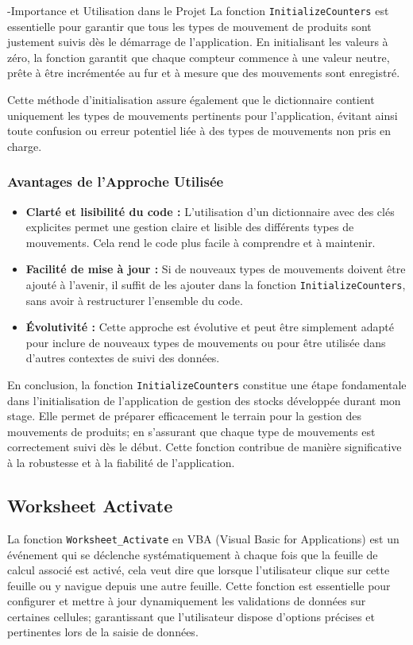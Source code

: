 \documentclass[a4paper, oneside, 12pt, final]{extreport}
\begin{document}
-Importance et Utilisation dans le Projet
La fonction \texttt{InitializeCounters} est essentielle pour garantir que tous les types de mouvement de produits sont justement suivis dès le démarrage de l'application. En initialisant les valeurs à zéro, la fonction garantit que chaque compteur commence à une valeur neutre, prête à être incrémentée au fur et à mesure que des mouvements sont enregistré.

Cette méthode d'initialisation assure également que le dictionnaire contient uniquement les types de mouvements pertinents pour l'application, évitant ainsi toute confusion ou erreur potentiel liée à des types de mouvements non pris en charge.

\subsubsection{Avantages de l'Approche Utilisée}
\begin{itemize}
    \item \textbf{Clarté et lisibilité du code :} L'utilisation d'un dictionnaire avec des clés explicites permet une gestion claire et lisible des différents types de mouvements. Cela rend le code plus facile à comprendre et à maintenir.
    \item \textbf{Facilité de mise à jour :} Si de nouveaux types de mouvements doivent être ajouté à l'avenir, il suffit de les ajouter dans la fonction \texttt{InitializeCounters}, sans avoir à restructurer l'ensemble du code.
    \item \textbf{Évolutivité :} Cette approche est évolutive et peut être simplement adapté pour inclure de nouveaux types de mouvements ou pour être utilisée dans d'autres contextes de suivi des données.
\end{itemize}


En conclusion, la fonction \texttt{InitializeCounters} constitue une étape fondamentale dans l'initialisation de l'application de gestion des stocks développée durant mon stage. Elle permet de préparer efficacement le terrain pour la gestion des mouvements de produits; en s'assurant que chaque type de mouvements est correctement suivi dès le début. Cette fonction contribue de manière significative à la robustesse et à la fiabilité de l'application.

\subsection{ Worksheet Activate}
La fonction \texttt{Worksheet\_Activate} en VBA (Visual Basic for Applications) est un événement qui se déclenche systématiquement à chaque fois que la feuille de calcul associé est activé, cela veut dire que lorsque l’utilisateur clique sur cette feuille ou y navigue depuis une autre feuille. Cette fonction est essentielle pour configurer et mettre à jour dynamiquement les validations de données sur certaines cellules; garantissant que l'utilisateur dispose d'options précises et pertinentes lors de la saisie de données.
\end{document}
